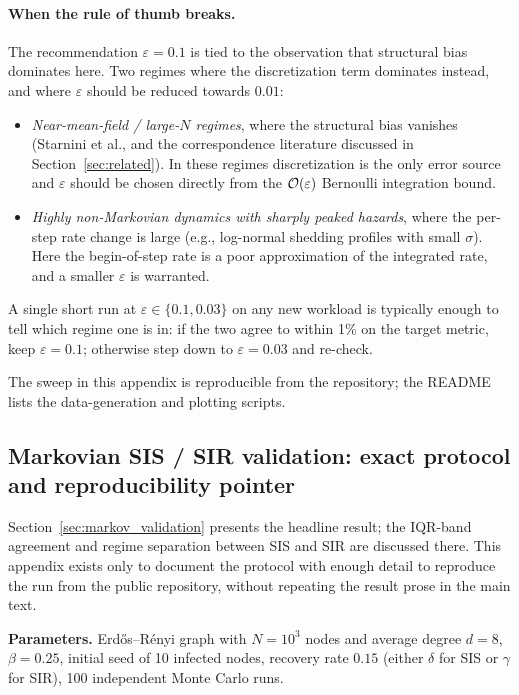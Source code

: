 \paragraph{When the rule of thumb breaks.}
The recommendation $\varepsilon = 0.1$ is tied to the observation that structural bias dominates here. Two regimes where the discretization term dominates instead, and where $\varepsilon$ should be reduced towards $0.01$:
\begin{itemize}
\item \emph{Near-mean-field / large-$N$ regimes}, where the structural bias vanishes (Starnini et al., and the correspondence literature discussed in Section~\ref{sec:related}). In these regimes discretization is the only error source and $\varepsilon$ should be chosen directly from the $\mathcal{O}(\varepsilon)$ Bernoulli integration bound.
\item \emph{Highly non-Markovian dynamics with sharply peaked hazards}, where the per-step rate change is large (e.g., log-normal shedding profiles with small $\sigma$). Here the begin-of-step rate is a poor approximation of the integrated rate, and a smaller $\varepsilon$ is warranted.
\end{itemize}
A single short run at $\varepsilon \in \{0.1, 0.03\}$ on any new workload is typically enough to tell which regime one is in: if the two agree to within 1\% on the target metric, keep $\varepsilon = 0.1$; otherwise step down to $\varepsilon = 0.03$ and re-check.

The sweep in this appendix is reproducible from the repository; the README lists the data-generation and plotting scripts.

\subsection{Markovian SIS / SIR validation: exact protocol and reproducibility pointer}
\label{app:sis_sir}

Section~\ref{sec:markov_validation} presents the headline result; the IQR-band agreement and regime separation between SIS and SIR are discussed there. This appendix exists only to document the protocol with enough detail to reproduce the run from the public repository, without repeating the result prose in the main text.

\textbf{Parameters.} Erd\H{o}s--R\'{e}nyi graph with $N = 10^3$ nodes and average degree $d = 8$, $\beta = 0.25$, initial seed of 10 infected nodes, recovery rate $0.15$ (either $\delta$ for SIS or $\gamma$ for SIR), 100 independent Monte Carlo runs.

